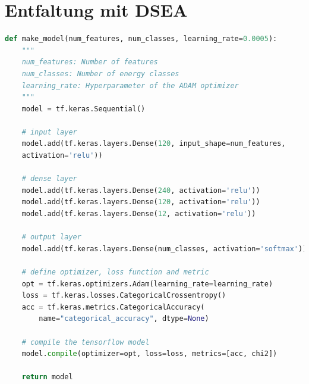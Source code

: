 \chapter{Entfaltung mit DSEA}

\begin{lstlisting}[language=Python, basicstyle=\small, captionpos=b, caption=Die Funktion wird zu Erstellung des Modells verwendet. Hier wird das NN mithilfe der Keras-API \cite{tensorflow2015-whitepaper} definiert. Die Ebenen können beliebig angepasst und erweitert werden., label=code:model]
def make_model(num_features, num_classes, learning_rate=0.0005): 
    """
    num_features: Number of features
    num_classes: Number of energy classes
    learning_rate: Hyperparameter of the ADAM optimizer
    """
    model = tf.keras.Sequential()

    # input layer
    model.add(tf.keras.layers.Dense(120, input_shape=num_features,
    activation='relu'))
    
    # dense layer
    model.add(tf.keras.layers.Dense(240, activation='relu'))
    model.add(tf.keras.layers.Dense(120, activation='relu'))
    model.add(tf.keras.layers.Dense(12, activation='relu'))
    
    # output layer
    model.add(tf.keras.layers.Dense(num_classes, activation='softmax'))

    # define optimizer, loss function and metric
    opt = tf.keras.optimizers.Adam(learning_rate=learning_rate)
    loss = tf.keras.losses.CategoricalCrossentropy()
    acc = tf.keras.metrics.CategoricalAccuracy(
        name="categorical_accuracy", dtype=None)

    # compile the tensorflow model
    model.compile(optimizer=opt, loss=loss, metrics=[acc, chi2])

    return model
\end{lstlisting}

